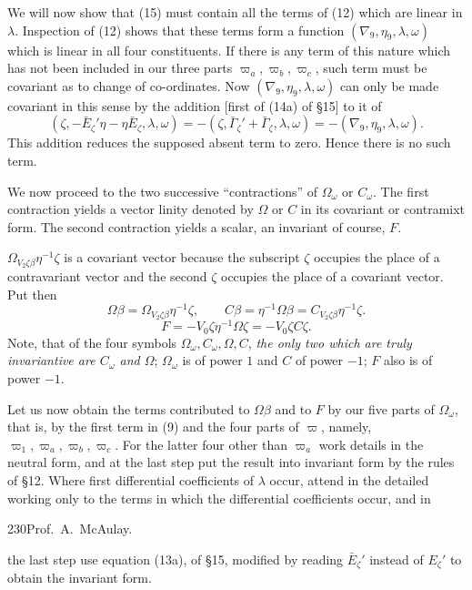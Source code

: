 \documentclass[11pt]{article}
\begin{document}
\indent We will now show that (15) must contain all the terms of (12) which are linear in $\lambda$. Inspection of (12) shows that these terms form a function $(\nabla_9,\eta_9,\lambda,\omega)$ which is linear in all four constituents. If there is any term of this nature which has not been included in our three parts $\varpi_a,\varpi_b,\varpi_c$, such term must be covariant as to change of co-ordinates. Now $(\nabla_9,\eta_9,\lambda,\omega)$ can only be made covariant in this sense by the addition [first of (14a) of \S15] to it of
\[
(\zeta,-\bar E_\zeta'\eta-\eta\bar E_\zeta,\lambda,\omega)=-(\zeta,\bar\Gamma_\zeta'+\bar\Gamma_\zeta,\lambda,\omega)=-(\nabla_9,\eta_9,\lambda,\omega).
\]
This addition reduces the supposed absent term to zero. Hence there is no such term.

\indent We now proceed to the two successive ``contractions'' of $\Omega_\omega$ or $C_\omega$. The first contraction yields a vector linity denoted by $\Omega$ or $C$ in its covariant or contramixt form. The second contraction yields a scalar, an invariant of course, $F$.

\indent $\Omega_{V_2\zeta\beta}\eta^{-1}\zeta$ is a covariant vector because the subscript $\zeta$ occupies the place of a contravariant vector and the second $\zeta$ occupies the place of a covariant vector. Put then
\begin{equation}\Omega\beta=\Omega_{V_2\zeta\beta}\eta^{-1}\zeta,\qquad C\beta=\eta^{-1}\Omega\beta=C_{V_2\zeta\beta}\eta^{-1}\zeta.\tag{18}\end{equation}
\begin{equation}F=-V_0\zeta\eta^{-1}\Omega\zeta=-V_0\zeta C\zeta.\tag{19}\end{equation}
\indent Note, that of the four symbols $\Omega_\omega,C_\omega,\Omega,C$, \emph{the only two which are truly invariantive are $C_\omega$ and $\Omega$}; $\Omega_\omega$ is of power $1$ and $C$ of power $-1$; $F$ also is of power $-1$.

\indent Let us now obtain the terms contributed to $\Omega\beta$ and to $F$ by our five parts of $\Omega_\omega$, that is, by the first term in (9) and the four parts of $\varpi$, namely, $\varpi_1,\varpi_a,\varpi_b,\varpi_c$. For the latter four other than $\varpi_a$ work details in the neutral form, and at the last step put the result into invariant form by the rules of \S12. Where first differential coefficients of $\lambda$ occur, attend in the detailed working only to the terms in which the differential coefficients occur, and in
\newpage\thispagestyle{empty}\begin{center}230\hfill Prof.\ A.\ McAulay.\end{center}
the last step use equation (13a), of \S15, modified by reading $\bar E_\zeta'$ instead of $E_\zeta'$ to obtain the invariant form.
\end{document}
